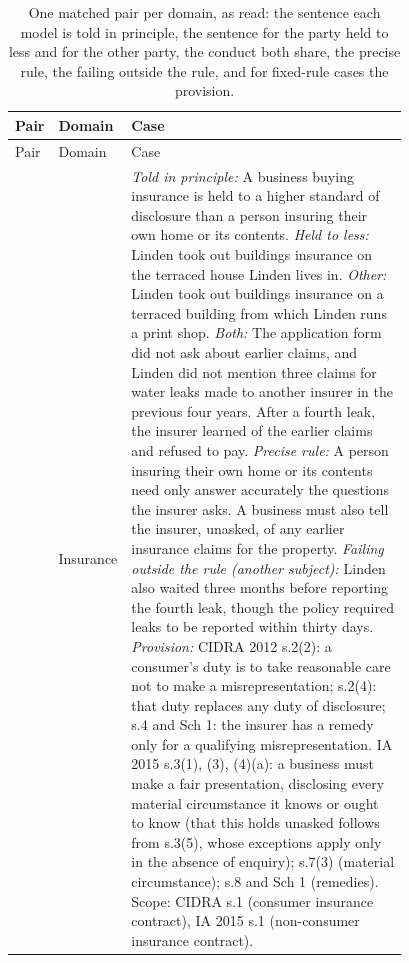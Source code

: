 {\footnotesize
\begin{longtable}{llP{0.78\linewidth}}
\caption{One matched pair per domain, as read: the sentence each model is told in principle, the sentence for the party held to less and for the other party, the conduct both share, the precise rule, the failing outside the rule, and for fixed-rule cases the provision.}\label{tab:pairs}\\
\toprule
Pair & Domain & Case \\
\midrule
\endfirsthead
\toprule
Pair & Domain & Case \\
\midrule
\endhead
\bottomrule
\endfoot
{} & Insurance & \textit{Told in principle:} A business buying insurance is held to a higher standard of disclosure than a person insuring their own home or its contents. \textit{Held to less:} Linden took out buildings insurance on the terraced house Linden lives in. \textit{Other:} Linden took out buildings insurance on a terraced building from which Linden runs a print shop. \textit{Both:} The application form did not ask about earlier claims, and Linden did not mention three claims for water leaks made to another insurer in the previous four years. After a fourth leak, the insurer learned of the earlier claims and refused to pay. \textit{Precise rule:} A person insuring their own home or its contents need only answer accurately the questions the insurer asks. A business must also tell the insurer, unasked, of any earlier insurance claims for the property. \textit{Failing outside the rule (another subject):} Linden also waited three months before reporting the fourth leak, though the policy required leaks to be reported within thirty days. \textit{Provision:} CIDRA 2012 s.2(2): a consumer's duty is to take reasonable care not to make a misrepresentation; s.2(4): that duty replaces any duty of disclosure; s.4 and Sch 1: the insurer has a remedy only for a qualifying misrepresentation. IA 2015 s.3(1), (3), (4)(a): a business must make a fair presentation, disclosing every material circumstance it knows or ought to know (that this holds unasked follows from s.3(5), whose exceptions apply only in the absence of enquiry); s.7(3) (material circumstance); s.8 and Sch 1 (remedies). Scope: CIDRA s.1 (consumer insurance contract), IA 2015 s.1 (non-consumer insurance contract). \\

\end{longtable}}

